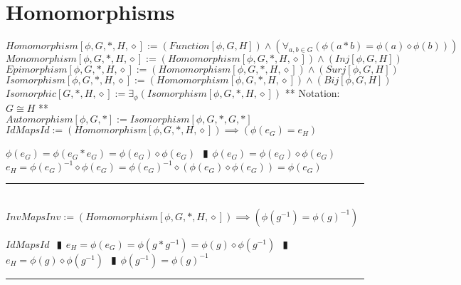 \documentclass{book}
\newcommand{\abr}{:=}
\newcommand{\pipe}{$\phantom{(}\vrectangleblack\phantom{)}$}
\newcommand{\pr}[1]{\left(#1\right)}
\begin{document}
\section{Homomorphisms}
$Homomorphism[\phi, G, *, H, \diamond] \abr (Function[\phi, G, H]) \land \pr{\forall_{a, b \in G}\pr{\phi(a * b) = \phi(a) \diamond \phi(b)}}$ \\
$Monomorphism[\phi, G, *, H, \diamond] \abr (Homomorphism[\phi, G, *, H, \diamond]) \land (Inj[\phi, G, H])$ \\
$Epimorphism[\phi, G, *, H, \diamond] \abr (Homomorphism[\phi, G, *, H, \diamond]) \land (Surj[\phi, G, H])$ \\
$Isomorphism[\phi, G, *, H, \diamond] \abr (Homomorphism[\phi, G, *, H, \diamond]) \land (Bij[\phi, G, H])$ \\
$Isomorphic[G, *, H, \diamond] \abr \exists_{\phi}(Isomorphism[\phi, G, *, H, \diamond])$ ** Notation: $G \cong H$ ** \\
$Automorphism[\phi, G, *] \abr Isomorphism[\phi, G, *, G, *]$ \\

$IdMapsId \abr (Homomorphism[\phi, G, *, H, \diamond]) \implies \pr{\phi(e_G) = e_H}$
\begin{enumerate}
  \lit $\phi(e_G) = \phi(e_G * e_G) = \phi(e_G) \diamond \phi(e_G)$ \pipe $\phi(e_G) = \phi(e_G) \diamond \phi(e_G)$
  \lit $e_H = \phi(e_G)^{-1} \diamond \phi(e_G) = \phi(e_G)^{-1} \diamond \pr{\phi(e_G) \diamond \phi(e_G)} = \phi(e_G)$
\end{enumerate} \vspace{.75mm} \hrule \vspace{.75mm} \ \\ 

$InvMapsInv \abr (Homomorphism[\phi, G, *, H, \diamond]) \implies \pr{\phi(g^{-1}) = \phi(g)^{-1}}$
\begin{enumerate}
  \lit $IdMapsId$ \pipe $e_H = \phi(e_G) = \phi(g * g^{-1}) = \phi(g) \diamond \phi(g^{-1})$ \pipe $e_H = \phi(g) \diamond \phi(g^{-1})$ \pipe $\phi(g^{-1}) = \phi(g)^{-1}$
\end{enumerate} \vspace{.75mm} \hrule \vspace{.75mm} \ \\ 
\end{document}
